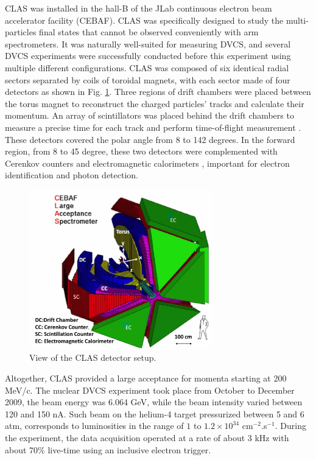\documentclass{article}
\begin{document}
CLAS \cite{Mecking:2003zu} was installed in the hall-B of the JLab continuous electron beam 
accelerator facility (CEBAF). CLAS was specifically designed to study the multi-particles 
final states that cannot be observed conveniently with arm spectrometers. It was naturally 
well-suited for measuring DVCS, and several DVCS experiments were successfully conducted 
before this experiment using multiple different configurations. CLAS was composed of six identical radial 
sectors separated by coils of toroidal magnets, with each sector made of four detectors 
as shown in Fig. \ref{fig:CLAS}. Three regions of drift chambers \cite{Mestayer:2000we} 
were placed between the torus magnet to reconstruct the charged particles' tracks and 
calculate their momentum. An array of scintillators was placed behind the drift chambers to measure 
a precise time for each track and perform time-of-flight measurement 
\cite{Smith:1999ii}. These detectors covered the polar angle from 8 to 142 degrees. 
In the forward region, from 8 to 45 degree, these two detectors were complemented with 
Cerenkov counters \cite{Adams:2001kk} and electromagnetic calorimeters \cite{Amarian:2001zs},
important for electron identification and photon detection. 

\begin{figure}[tbp!]
\center
\includegraphics[width=8cm]{fig3/CLAS_geantview-PS.jpg}
	\caption{View of the CLAS detector setup.}
\label{fig:CLAS}
\end{figure}


Altogether, CLAS provided a large acceptance for momenta 
starting at 200 MeV/c. The nuclear DVCS experiment took place from October to December 2009,
the beam energy was 6.064 GeV, while the beam intensity varied
between 120 and 150 nA. Such beam on the helium-4 target pressurized between 5 and 6 atm,
corresponds to luminosities in the range of $1$ to $1.2 \times 10^{34}$ cm$^{-2}$.s$^{-1}$.
During the experiment, the data acquisition operated at a rate of about 3 kHz with about 70\% live-time
using an inclusive electron trigger. 
\end{document}
